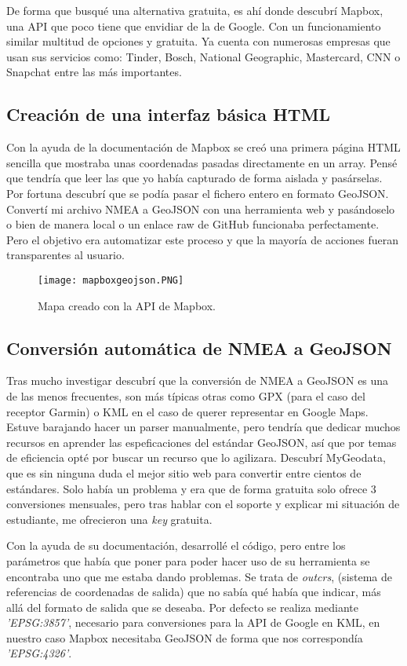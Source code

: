 De forma que busqué una alternativa gratuita, es ahí donde descubrí Mapbox, una API que poco tiene que envidiar de la de Google. Con un funcionamiento similar multitud de opciones y gratuita. Ya cuenta con numerosas empresas que usan sus servicios como: Tinder, Bosch, National Geographic, Mastercard, CNN o Snapchat entre las más importantes.

\subsection{Creación de una interfaz básica HTML}
Con la ayuda de la documentación de Mapbox\cite{mapboxapi} se creó una primera página HTML sencilla que mostraba unas coordenadas pasadas directamente en un array. Pensé que tendría que leer las que yo había capturado de forma aislada y pasárselas. Por fortuna descubrí que se podía pasar el fichero entero en formato GeoJSON. Convertí mi archivo NMEA a GeoJSON con una herramienta web y pasándoselo o bien de manera local o un enlace raw de GitHub funcionaba perfectamente. Pero el objetivo era automatizar este proceso y que la mayoría de acciones fueran transparentes al usuario.
\begin{figure}[!h]
	\centering
	\texttt{[image: mapboxgeojson.PNG]}
	\caption{Mapa creado con la API de Mapbox.}\label{fig:mapboxgeojson.PNG}
\end{figure}
\FloatBarrier

\subsection{Conversión automática de NMEA a GeoJSON}
Tras mucho investigar descubrí que la conversión de NMEA a GeoJSON es una de las menos frecuentes, son más típicas otras como GPX (para el caso del receptor Garmin) o KML en el caso de querer representar en Google Maps. Estuve barajando hacer un parser manualmente, pero tendría que dedicar muchos recursos en aprender las espeficaciones del estándar GeoJSON, así que por temas de eficiencia opté por buscar un recurso que lo agilizara. Descubrí MyGeodata, que es sin ninguna duda el mejor sitio web para convertir entre cientos de estándares. Solo había un problema y era que de forma gratuita solo ofrece 3 conversiones mensuales, pero tras hablar con el soporte y explicar mi situación de estudiante, me ofrecieron una \textit{key} gratuita. 

Con la ayuda de su documentación,\cite{mygeodataapi} desarrollé el código, pero entre los parámetros que había que poner para poder hacer uso de su herramienta se encontraba uno que me estaba dando problemas. Se trata de \textit{outcrs}, (sistema de referencias de coordenadas de salida) que no sabía qué había que indicar, más allá del formato de salida que se deseaba. Por defecto se realiza mediante \textit{'EPSG:3857'}, necesario para conversiones para la API de Google en KML, en nuestro caso Mapbox necesitaba GeoJSON de forma que nos correspondía \textit{'EPSG:4326'}.

